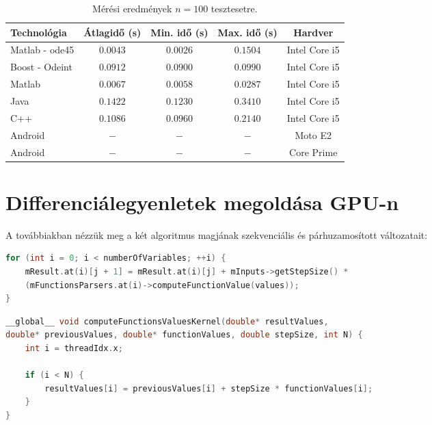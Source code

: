 \begin{table}[h!]
	\centering
	\begin{tabular}{ | l | c | c | c | c |}
		\hline 
		\textbf{Technológia} & \textbf{Átlagidő (s)} & \textbf{Min. idő (s)} & \textbf{Max. idő (s)} & \textbf{Hardver}\\
		\hline
		Matlab - ode45 & $ 0.0043 $ & $ 0.0026 $ & $ 0.1504 $ & Intel Core i5\\
		\hline
		Boost - Odeint & $ 0.0912 $ & $ 0.0900 $ & $ 0.0990 $ & Intel Core i5\\
		\hline
		Matlab & $ 0.0067 $ & $ 0.0058 $ & $ 0.0287 $ & Intel Core i5\\
		\hline
		Java & $ 0.1422 $ & $ 0.1230 $ & $ 0.3410 $ & Intel Core i5\\ 
		\hline
		C++ & $ 0.1086 $ & $ 0.0960 $ & $ 0.2140 $ & Intel Core i5\\
		\hline
		Android & $ - $ & $ - $ & $ - $ & Moto E2\\
		\hline
		Android & $ - $ & $ - $ & $ - $ & Core Prime\\
		\hline
	\end{tabular}
	\caption{Mérési eredmények  $ n = 100 $ tesztesetre.}
\end{table}



\section {Differenciálegyenletek megoldása GPU-n} \label{fejezet3_4}


A továbbiakban nézzük meg a két algoritmus magjának szekvenciális és párhuzamosított változatait:
\begin{lstlisting}[caption={Euler módszer szekvenciális kód.}, captionpos=b, language = C++]
for (int i = 0; i < numberOfVariables; ++i) {
	mResult.at(i)[j + 1] = mResult.at(i)[j] + mInputs->getStepSize() *
	(mFunctionsParsers.at(i)->computeFunctionValue(values));
}
\end{lstlisting}

\begin{lstlisting}[caption={Euler módszer párhuzamosított kód.}, captionpos=b, language = C++]
__global__ void computeFunctionsValuesKernel(double* resultValues,
double* previousValues, double* functionValues, double stepSize, int N) {
	int i = threadIdx.x;
	
	if (i < N) {
		resultValues[i] = previousValues[i] + stepSize * functionValues[i];
	}
}
\end{lstlisting}

